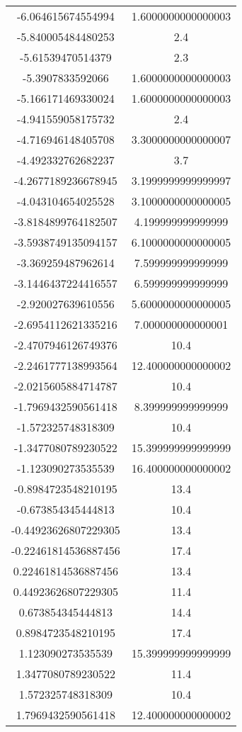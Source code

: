 \begin{table}
\begin{tabular}{S[]S[]}
-6.064615674554994 & 1.6000000000000003\\
-5.840005484480253 & 2.4\\
-5.61539470514379 & 2.3\\
-5.3907833592066 & 1.6000000000000003\\
-5.166171469330024 & 1.6000000000000003\\
-4.941559058175732 & 2.4\\
-4.716946148405708 & 3.3000000000000007\\
-4.492332762682237 & 3.7\\
-4.2677189236678945 & 3.1999999999999997\\
-4.043104654025528 & 3.1000000000000005\\
-3.8184899764182507 & 4.199999999999999\\
-3.5938749135094157 & 6.1000000000000005\\
-3.369259487962614 & 7.599999999999999\\
-3.1446437224416557 & 6.599999999999999\\
-2.920027639610556 & 5.6000000000000005\\
-2.6954112621335216 & 7.000000000000001\\
-2.4707946126749376 & 10.4\\
-2.2461777138993564 & 12.400000000000002\\
-2.0215605884714787 & 10.4\\
-1.7969432590561418 & 8.399999999999999\\
-1.572325748318309 & 10.4\\
-1.3477080789230522 & 15.399999999999999\\
-1.123090273535539 & 16.400000000000002\\
-0.8984723548210195 & 13.4\\
-0.673854345444813 & 10.4\\
-0.44923626807229305 & 13.4\\
-0.22461814536887456 & 17.4\\
0.22461814536887456 & 13.4\\
0.44923626807229305 & 11.4\\
0.673854345444813 & 14.4\\
0.8984723548210195 & 17.4\\
1.123090273535539 & 15.399999999999999\\
1.3477080789230522 & 11.4\\
1.572325748318309 & 10.4\\
1.7969432590561418 & 12.400000000000002\\

\end{tabular}
\end{table}
